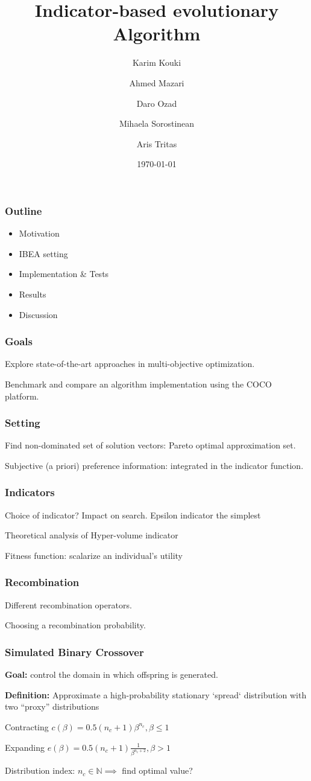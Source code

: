 \documentclass[12pt]{beamer}
\title{Indicator-based evolutionary Algorithm}
\author{Karim Kouki \and Ahmed Mazari \and Daro Ozad \\ \and Mihaela Sorostinean \and Aris Tritas}
\institute{
	M.Sc. Machine Learning, Information and Content - 
	University of Paris-Saclay
}
\date{\today}
\newcommand{\bi}{\begin{itemize}}
\newcommand{\ei}{\end{itemize}}
\begin{document}
  \begin{frame}
  	\titlepage
  \end{frame}
  
  \begin{frame}
    \frametitle{Outline}
    \bi
    \item Motivation
    \item IBEA setting
    \item Implementation \& Tests
    \item Results
    \item Discussion
    \ei
    
  \end{frame}
  
    \begin{frame}
    \frametitle{Goals}
    Explore state-of-the-art approaches in multi-objective optimization.
    
	Benchmark and compare an algorithm implementation using the COCO platform.
    
  \end{frame}
    
    \begin{frame}
    \frametitle{Setting}
	Find non-dominated set of solution vectors: Pareto optimal approximation set. 
	
	Subjective (a priori) preference information: integrated in the indicator function.
  \end{frame}
  
    \begin{frame}
    \frametitle{Indicators}
    Choice of indicator? Impact on search. Epsilon indicator the simplest 
    
    Theoretical analysis of Hyper-volume indicator
    
    Fitness function: scalarize an individual's utility
    
  \end{frame}
  
  
    \begin{frame}
    \frametitle{Recombination}
    
    Different recombination operators.
    
    Choosing a recombination probability.
    
  \end{frame}

  \begin{frame}
    \frametitle{Simulated Binary Crossover}
    \textbf{Goal:} control the domain in which offspring is generated.
    
    \textbf{Definition:} Approximate a high-probability stationary `spread` distribution with two ``proxy'' distributions
    
    Contracting $ c(\beta) = 0.5(n_c +1)\beta^{n_c}, \beta \leq 1$
    
	Expanding $ e(\beta) = 0.5(n_c +1)\frac{1}{\beta^{n_c+2}}, \beta > 1$
        
    Distribution index: $n_c \in \mathbb{N} \implies$ find optimal value?
  \end{frame}
    
\end{document}
